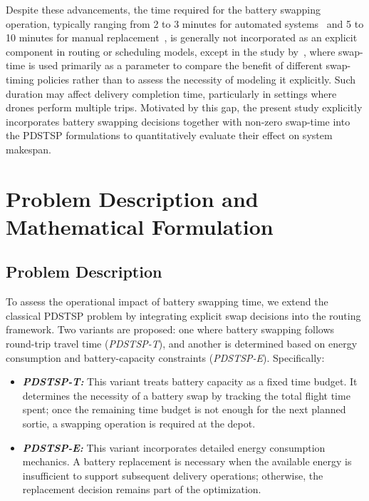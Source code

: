 \documentclass[3p, authoryear, 11pt]{elsarticle}
\begin{document}
Despite these advancements, the time required for the battery swapping operation, typically ranging from 2 to 3 minutes for automated systems~\citep{vilkki_automatic_2024,cokyasar_designing_2021} and 5 to 10 minutes for manual replacement~\citep{fhwa_uas_2018}, is generally not incorporated as an explicit component in routing or scheduling models, except in the study by~\citet{liu_ondemand_2026}, where swap-time is used primarily as a parameter to compare the benefit of different swap-timing policies rather than to assess the necessity of modeling it explicitly.
Such duration may affect delivery completion time, particularly in settings where drones perform multiple trips. 
Motivated by this gap, the present study explicitly incorporates battery swapping decisions together with non-zero swap-time into the PDSTSP formulations to quantitatively evaluate their effect on system makespan.


\section{Problem Description and Mathematical Formulation}
\label{sec:problem_formulation}

\subsection{Problem Description}
\label{sec:problem}

To assess the operational impact of battery swapping time, we extend the classical PDSTSP problem by integrating explicit swap decisions into the routing framework. Two variants are proposed: one where battery swapping follows round-trip travel time (\textit{PDSTSP-T}), and another is determined based on energy consumption and battery-capacity constraints (\textit{PDSTSP-E}). Specifically:
\begin{itemize}
    \item \textbf{\textit{PDSTSP-T: }} This variant treats battery capacity as a fixed time budget. It determines the necessity of a battery swap by tracking the total flight time spent; once the remaining time budget is not enough for the next planned sortie, a swapping operation is required at the depot.
    \label{sec:time_model_des}
    
    \item \textbf{\textit{PDSTSP-E: }} This variant incorporates detailed energy consumption mechanics. A battery replacement is necessary when the available energy is insufficient to support subsequent delivery operations; otherwise, the replacement decision remains part of the optimization.
    \label{sec:en_model_des}
\end{itemize}
\end{document}

